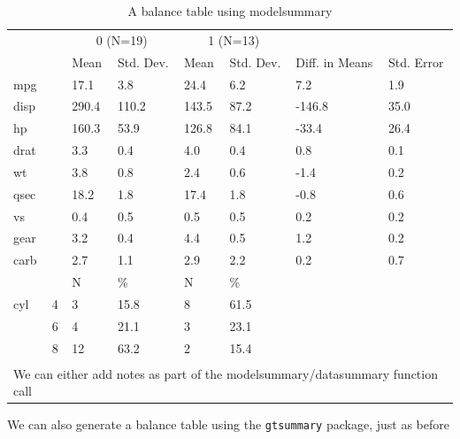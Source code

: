 \documentclass[
  11pt,
a4paper
]{article}
\begin{document}
\begin{table}

\caption{\label{tab:balance}A balance table using modelsummary}
\centering
\begin{tabular}[t]{llllllll}
\toprule
\multicolumn{2}{c}{ } & \multicolumn{2}{c}{0 (N=19)} & \multicolumn{2}{c}{1 (N=13)} & \multicolumn{2}{c}{ } \\
\cmidrule(l{3pt}r{3pt}){3-4} \cmidrule(l{3pt}r{3pt}){5-6}
  &    & Mean & Std. Dev. & Mean  & Std. Dev.  & Diff. in Means & Std. Error\\
\midrule
mpg &  & 17.1 & 3.8 & 24.4 & 6.2 & 7.2 & 1.9\\
disp &  & 290.4 & 110.2 & 143.5 & 87.2 & -146.8 & 35.0\\
hp &  & 160.3 & 53.9 & 126.8 & 84.1 & -33.4 & 26.4\\
drat &  & 3.3 & 0.4 & 4.0 & 0.4 & 0.8 & 0.1\\
wt &  & 3.8 & 0.8 & 2.4 & 0.6 & -1.4 & 0.2\\
qsec &  & 18.2 & 1.8 & 17.4 & 1.8 & -0.8 & 0.6\\
vs &  & 0.4 & 0.5 & 0.5 & 0.5 & 0.2 & 0.2\\
gear &  & 3.2 & 0.4 & 4.4 & 0.5 & 1.2 & 0.2\\
carb &  & 2.7 & 1.1 & 2.9 & 2.2 & 0.2 & 0.7\\
\midrule
 &  & N & \% & N & \% &  & \\
cyl & 4 & 3 & 15.8 & 8 & 61.5 &  & \\
 & 6 & 4 & 21.1 & 3 & 23.1 &  & \\
 & 8 & 12 & 63.2 & 2 & 15.4 &  & \\
\bottomrule
\multicolumn{8}{l}{\textsuperscript{} We can either add notes as part of the modelsummary/datasummary function call}\\
\end{tabular}
 \end{table}



We can also generate a balance table using the \texttt{gtsummary} package, just as before
\end{document}
